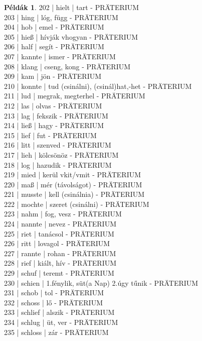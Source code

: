 \documentclass{article}
\theoremstyle{definition}
\newtheorem*{exmp}{Példák}
\begin{document}
\begin{exmp}
202 | hielt | tart - PRÄTERIUM\\
203 | hing | lóg, függ - PRÄTERIUM\\
204 | hob | emel - PRÄTERIUM\\
205 | hieß | hívják vhogyan - PRÄTERIUM\\
206 | half | segít - PRÄTERIUM\\
207 | kannte | ismer - PRÄTERIUM\\
208 | klang | cseng, kong - PRÄTERIUM\\
209 | kam | jön - PRÄTERIUM\\
210 | konnte | tud (csinálni), (csinál)hat,-het - PRÄTERIUM\\
211 | lud | megrak, megterhel  - PRÄTERIUM\\
212 | las | olvas - PRÄTERIUM\\
213 | lag | fekszik - PRÄTERIUM\\
214 | ließ | hagy - PRÄTERIUM\\
215 | lief | fut - PRÄTERIUM\\
216 | litt | szenved - PRÄTERIUM\\
217 | lieh | kölcsönöz - PRÄTERIUM\\
218 | log | hazudik - PRÄTERIUM\\
219 | mied | kerül vkit/vmit - PRÄTERIUM\\
220 | maß | mér (távolságot) - PRÄTERIUM\\
221 | musste | kell (csinálnia) - PRÄTERIUM\\
222 | mochte | szeret (csinálni) - PRÄTERIUM\\
223 | nahm | fog, vesz - PRÄTERIUM\\
224 | nannte | nevez - PRÄTERIUM\\
225 | riet | tanácsol - PRÄTERIUM\\
226 | ritt | lovagol - PRÄTERIUM\\
227 | rannte  | rohan - PRÄTERIUM\\
228 | rief | kiált, hív - PRÄTERIUM\\
229 | schuf | teremt - PRÄTERIUM\\
230 | schien | 1.fénylik, süt(a Nap) 2.úgy tűnik - PRÄTERIUM\\
231 | schob | tol - PRÄTERIUM\\
232 | schoss | lő - PRÄTERIUM\\
233 | schlief | alszik - PRÄTERIUM\\
234 | schlug | üt, ver - PRÄTERIUM\\
235 | schloss | zár - PRÄTERIUM\\

\end{exmp}
\end{document}
